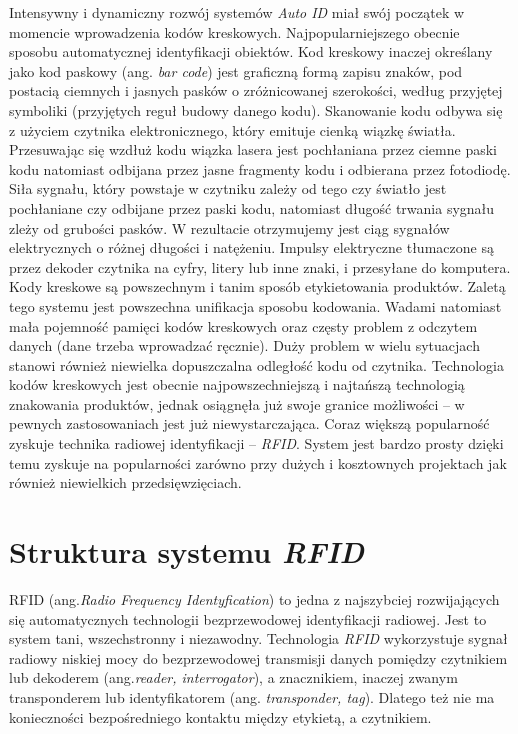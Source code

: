 Intensywny i dynamiczny rozwój systemów \emph{Auto ID} miał swój początek w momencie wprowadzenia kodów kreskowych. Najpopularniejszego obecnie sposobu automatycznej identyfikacji obiektów.
Kod kreskowy inaczej określany jako kod paskowy (ang. \emph{bar code}) jest graficzną formą zapisu znaków, pod postacią ciemnych i jasnych pasków o zróżnicowanej szerokości, według przyjętej symboliki  (przyjętych reguł budowy danego kodu). Skanowanie kodu odbywa się z użyciem czytnika elektronicznego, który emituje cienką wiązkę światła.
Przesuwając się wzdłuż kodu wiązka lasera jest  pochłaniana przez ciemne paski kodu natomiast odbijana przez jasne fragmenty kodu i odbierana przez fotodiodę.
Siła sygnału, który powstaje w czytniku zależy od tego czy światło jest pochłaniane czy odbijane przez paski kodu, natomiast długość trwania sygnału zleży od grubości pasków. W rezultacie otrzymujemy jest ciąg sygnałów elektrycznych o różnej długości i natężeniu. Impulsy elektryczne tłumaczone są przez dekoder czytnika na cyfry, litery lub inne znaki, i przesyłane do komputera. 
Kody kreskowe są powszechnym i tanim sposób etykietowania produktów. Zaletą tego systemu jest powszechna unifikacja sposobu kodowania. Wadami  natomiast mała pojemność pamięci kodów kreskowych oraz częsty problem z odczytem danych (dane trzeba wprowadzać ręcznie). Duży problem w wielu sytuacjach stanowi również niewielka dopuszczalna odległość kodu od czytnika. 
Technologia kodów kreskowych jest obecnie najpowszechniejszą i najtańszą technologią znakowania produktów, jednak osiągnęła już swoje granice możliwości – w pewnych zastosowaniach jest już niewystarczająca.
Coraz większą popularność zyskuje technika radiowej identyfikacji – \emph{RFID}. System jest bardzo prosty dzięki temu zyskuje na popularności zarówno przy dużych i kosztownych projektach jak również  niewielkich przedsięwzięciach.

\newpage

\section{Struktura systemu \emph{RFID}}

RFID (ang.\emph {Radio Frequency  Identyfication}) to jedna z najszybciej rozwijających  się automatycznych technologii bezprzewodowej  identyfikacji radiowej. Jest to system tani, wszechstronny i niezawodny. Technologia \emph{RFID} wykorzystuje sygnał radiowy niskiej mocy do bezprzewodowej transmisji danych pomiędzy czytnikiem lub dekoderem  (ang.\emph{reader, interrogator}), a znacznikiem, inaczej zwanym transponderem lub identyfikatorem (ang. \emph{transponder, tag}). Dlatego też nie ma konieczności bezpośredniego kontaktu między etykietą, a czytnikiem.

